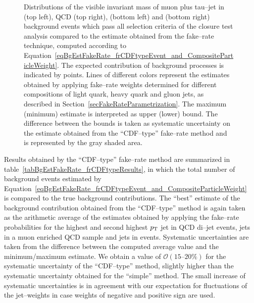 \begin{figure}[t]
\begin{center}
\begin{picture}
\end{picture}
\caption[Visible mass in the Fake--rate method]{\captiontext Distributions of
the visible invariant mass of muon plus tau--jet in \WpJets (top left), QCD (top
right), \ttbarpJets (bottom left) and \ZMM (bottom right) background events
which pass all selection criteria of the closure test analysis compared to the
estimate obtained from the fake--rate technique, computed according to
Equation~\ref{eqBgEstFakeRate_frCDFtypeEvent_and_CompositeParticleWeight}.  The
expected contribution of background processes is indicated by points.  Lines of
different colors represent the estimates obtained by applying fake--rate weights
determined for different compositions of light quark, heavy quark and gluon
jets, as described in Section~\ref{secFakeRateParametrization}.  The maximum
(minimum) estimate is interpreted as upper (lower) bound.  The difference
between the bounds is taken as systematic uncertainty on the estimate obtained
from the ``CDF--type'' fake--rate method and is represented by the gray shaded
area.} \label{figBgEstFakeRate_frCDFtypeResults_mVisible}
\end{center}
\end{figure} 

Results obtained by the ``CDF--type'' fake--rate method are summarized in
table~\ref{tabBgEstFakeRate_frCDFtypeResults}, in which the total number of
background events estimated by
Equation~\ref{eqBgEstFakeRate_frCDFtypeEvent_and_CompositeParticleWeight} is
compared to the true background contributions.  The ``best'' estimate of the
background contribution obtained from the ``CDF--type'' method is again taken as
the arithmetic average of the estimates obtained by applying the fake--rate
probabilities for the highest and second highest $\pt$ jet in QCD di--jet
events, jets in a muon enriched QCD sample and jets in \WpJets events.
Systematic uncertainties are taken from the difference between the computed
average value and the minimum/maximum estimate.  We obtain a value of
$\mathcal{O} \left( 15 \mbox{--} 20 \% \right)$ for the systematic uncertainty
of the ``CDF--type'' method, slightly higher than the systematic uncertainty
obtained for the ``simple'' method.  The small increase of systematic
uncertainties is in agreement with our expectation for fluctuations of the
jet--weights in case weights of negative and positive sign are used.

